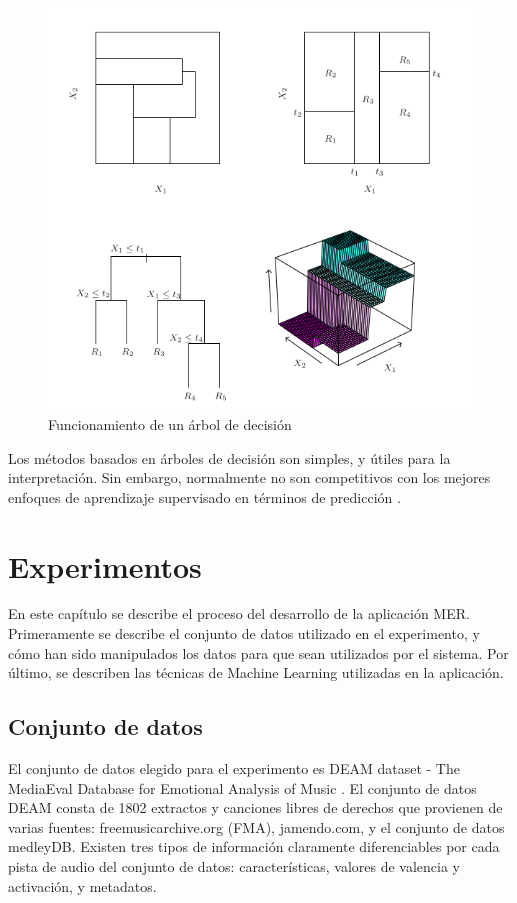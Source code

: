 \documentclass[12pt,a4paper,Spanish]{article}
\begin{document}
\begin{figure}[H]
	\centering
	\includegraphics[width=0.7\linewidth]{figs/decission_tree}
	\caption{Funcionamiento de un árbol de decisión}
	\label{fig:decissiontree}
\end{figure}


Los métodos basados en árboles de decisión son simples, y útiles para la interpretación. Sin embargo, normalmente no son competitivos con los mejores enfoques de aprendizaje supervisado en términos de predicción \cite{gareth2013introduction}.







\newpage
\section{Experimentos}
En este capítulo se describe el proceso del desarrollo de la aplicación MER. Primeramente se describe el conjunto de datos utilizado en el experimento, y cómo han sido manipulados los datos para que sean utilizados por el sistema. Por último, se describen las técnicas de Machine Learning utilizadas en la aplicación.


\subsection{Conjunto de datos}
El conjunto de datos elegido para el experimento es DEAM dataset - The MediaEval Database for Emotional Analysis of Music \cite{AlajankiEmoInMusicAnalysis}. El conjunto de datos DEAM consta de 1802 extractos y canciones libres de derechos que provienen de varias fuentes: freemusicarchive.org (FMA), jamendo.com,
y el conjunto de datos medleyDB.
\newline
Existen tres tipos de información claramente diferenciables por cada pista de audio del conjunto de datos: características, valores de valencia y activación, y metadatos.
\end{document}
